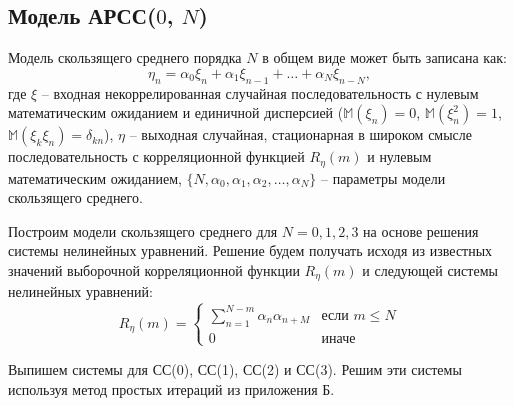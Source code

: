 \documentclass[12pt, fleqn]{article}
\begin{document}
{{		\subsection{Модель АРСС($0$, $N$)} {
			Модель скользящего среднего порядка $N$ в общем виде может быть записана как:
			\begin{equation}
				\eta_n = \alpha_0 \xi_n + \alpha_1 \xi_{n-1} + \dots + \alpha_N \xi_{n - N},
			\end{equation}
			где $\xi$ -- входная некоррелированная случайная последовательность с нулевым математическим ожиданием и единичной дисперсией ($\mathbb{M}(\xi_n)=0$, $\mathbb{M}(\xi^2_n)=1$, $\mathbb{M}(\xi_k \xi_n)=\delta_{kn}$), $\eta$ -- выходная случайная, стационарная в широком смысле последовательность с корреляционной функцией $R_{\eta}(m)$ и нулевым математическим ожиданием, $\{N, \alpha_0, \alpha_1, \alpha_2, \dots, \alpha_N\}$ -- параметры модели скользящего среднего.\medskip
								  
			Построим модели скользящего среднего для $N = 0,1,2,3$ на основе решения системы нелинейных уравнений. Решение будем получать исходя из известных значений выборочной корреляционной функции $R_{\eta}(m)$ и следующей системы нелинейных уравнений:
			\begin{equation}
				R_{\eta}(m) = 
				\begin{cases}
					\displaystyle\sum_{n=1}^{N-m}{\alpha_n \alpha_{n+M}} & \text{если } m \leq N \\
					0                                                    & \text{иначе}         
				\end{cases}
			\end{equation}
								  
			Выпишем системы для СС(0), СС(1), СС(2) и СС(3). Решим эти системы используя метод простых итераций из приложения Б.
								  
}}}
\end{document}
